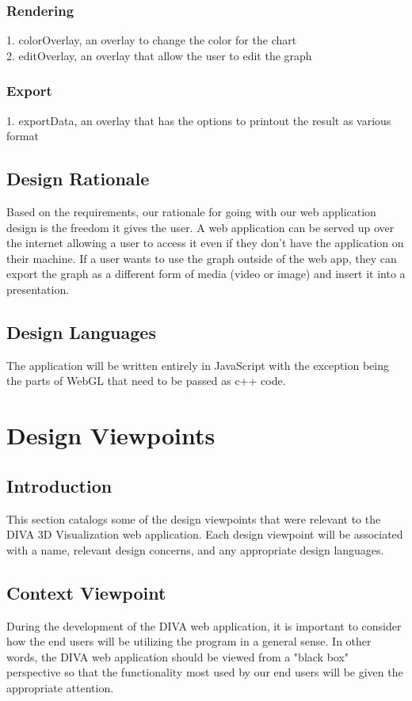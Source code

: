 \documentclass[journal,10pt,onecolumn,compsoc]{IEEEtran} \usepackage[margin=1.0in]{geometry} \usepackage{pdfpages}
\begin{document}
        \subsubsection{Rendering}
        1. colorOverlay, an overlay to change the color for the chart\\
        2. editOverlay, an overlay that allow the user to edit the graph
        
        \subsubsection{Export}
        1. exportData, an overlay that has the options to printout the result as various format
        
    \subsection{Design Rationale}
    Based on the requirements, our rationale for going with our web application design is the freedom it gives the user. A web application can be served up over the internet allowing a user to access it even if they don't have the application on their machine. If a user wants to use the graph outside of the web app, they can export the graph as a different form of media (video or image) and insert it into a presentation.
    \subsection{Design Languages}
    The application will be written entirely in JavaScript with the exception being the parts of WebGL that need to be passed as c++ code. 

\section{Design Viewpoints}
    \subsection{Introduction}
    This section catalogs some of the design viewpoints that were relevant to the DIVA 3D  Visualization web application. Each design viewpoint will be associated with a name, relevant design concerns, and any appropriate design languages. 
    \subsection{Context Viewpoint}
    During the development of the DIVA web application, it is important to consider how the end users will be utilizing the program in a general sense. In other words, the DIVA web application should be viewed from a "black box" perspective so that the functionality most used by our end users will be given the appropriate attention.
\end{document}
